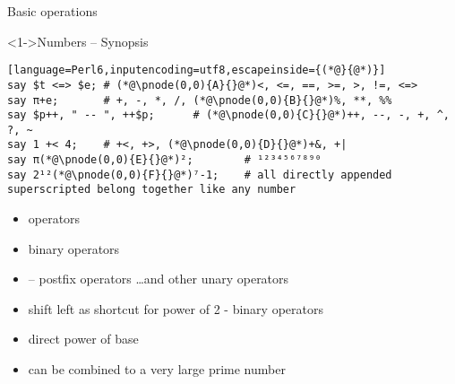 \begin{frame}[fragile]{Basic operations}
\begin{block}<1->{Numbers -- Synopsis}
\small
\begin{lstlisting}[language=Perl6,inputencoding=utf8,escapeinside={(*@}{@*)}]
say $t <=> $e; # (*@\pnode(0,0){A}{}@*)<, <=, ==, >=, >, !=, <=>
say π+e;       # +, -, *, /, (*@\pnode(0,0){B}{}@*)%, **, %%
say $p++, " -- ", ++$p;      # (*@\pnode(0,0){C}{}@*)++, --, -, +, ^, ?, ~
say 1 +< 4;    # +<, +>, (*@\pnode(0,0){D}{}@*)+&, +|
say π(*@\pnode(0,0){E}{}@*)²;        # ¹²³⁴⁵⁶⁷⁸⁹⁰
say 2¹²(*@\pnode(0,0){F}{}@*)⁷-1;    # all directly appended superscripted belong together like any number
\end{lstlisting}

\end{block}

\begin{itemize}
\item<2->  operators
\item<3-> binary  operators
\item<4->  -- postfix operators \ldots and other unary operators
\item<5-> shift left as shortcut for power of 2 - binary  operators
\item<6-> direct power of  base
\item<7-> can be combined to a very large prime number
\end{itemize}
\end{frame}

